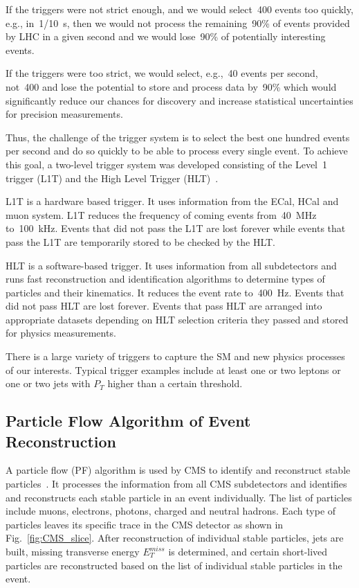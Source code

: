 
If the triggers were not strict enough, and we would select~400 events too quickly, e.g., in~1/10~s, then we would not process the remaining~90\% of events provided by LHC in a given second and we would lose~90\% of potentially interesting events.

If the triggers were too strict, we would select, e.g.,~40 events per second, not~400 and lose the potential to store and process data by~90\% which would significantly reduce our chances for discovery and increase statistical uncertainties for precision measurements.

Thus, the challenge of the trigger system is to select the best one hundred events per second and do so quickly to be able to process every single event. To achieve this goal, a two-level trigger system was developed consisting of the Level~1 trigger (L1T) and the High Level Trigger (HLT)~\cite{ref_TriggerSystem}.

L1T is a hardware based trigger. It uses information from the ECal, HCal and muon system. L1T reduces the frequency of coming events from~40~MHz to~100~kHz. Events that did not pass the L1T are lost forever while events that pass the L1T are temporarily stored to be checked by the HLT.

HLT is a software-based trigger. It uses information from all subdetectors and runs fast reconstruction and identification algorithms to determine types of particles and their kinematics. It reduces the event rate to~400~Hz. Events that did not pass HLT are lost forever. Events that pass HLT are arranged into appropriate datasets depending on HLT selection criteria they passed and stored for physics measurements.

There is a large variety of triggers to capture the SM and new physics processes of our interests.  Typical trigger examples include at least one or two leptons or one or two jets with $P_T$ higher than a certain threshold. 


\subsection{Particle Flow Algorithm of Event Reconstruction}

A particle flow (PF) algorithm is used by CMS to identify and reconstruct stable particles~\cite{ref_ParticleFlowAlg}. It processes the information from all CMS subdetectors and identifies and reconstructs each stable particle in an event individually. The list of particles include muons, electrons, photons, charged and neutral hadrons. Each type of particles leaves its specific trace in the CMS detector as shown in Fig.~\ref{fig:CMS_slice}. After reconstruction of individual stable particles, jets are built, missing transverse energy $E_T^{miss}$ is determined, and certain short-lived particles are reconstructed based on the list of individual stable particles in the event.

